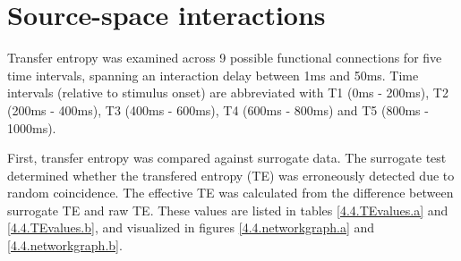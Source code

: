 \section{Source-space interactions}

Transfer entropy was examined across 9 possible functional connections for five time intervals, spanning an interaction delay between 1ms and 50ms.
Time intervals (relative to stimulus onset) are abbreviated with T1 (0ms - 200ms), T2 (200ms - 400ms), T3 (400ms - 600ms), T4 (600ms - 800ms) and T5 (800ms - 1000ms).

First, transfer entropy was compared against surrogate data.
The surrogate test determined whether the transfered entropy (TE) was erroneously detected due to random coincidence.
The effective TE was calculated from the difference between surrogate TE and raw TE.
These values are listed in tables \ref{4.4.TEvalues.a} and \ref{4.4.TEvalues.b}, and visualized in figures \ref{4.4.networkgraph.a} and \ref{4.4.networkgraph.b}.

